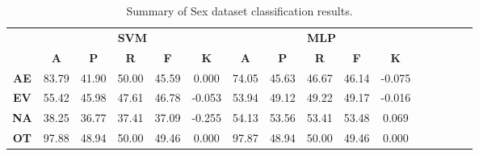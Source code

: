 \begin{landscape}
\begin{table}[htbp]
\footnotesize
\centering
\caption{Summary of Sex dataset classification results.}
\label{tab:base_female}
\begin{tabular}{|c|c|c|c|c|c|c|c|c|c|c|c|c|c|c|c|}
\hline
\multirow{2}{*}{}	& \multicolumn{5}{c|}{\textbf{SVM}}												& \multicolumn{5}{c|}{\textbf{MLP}}												\\ \cline{2-11} 
					& \textbf{A}	& \textbf{P}	& \textbf{R}	& \textbf{F}	& \textbf{K}	& \textbf{A}	& \textbf{P}	& \textbf{R}	& \textbf{F}	& \textbf{K}	\\ \hline
\textbf{AE}			& 83.79			& 41.90			& 50.00			& 45.59			& 0.000			& 74.05			& 45.63			& 46.67			& 46.14			& -0.075			\\ \hline
\textbf{EV}			& 55.42			& 45.98			& 47.61			& 46.78			& -0.053			& 53.94			& 49.12			& 49.22			& 49.17			& -0.016			\\ \hline
\textbf{NA}			& 38.25			& 36.77			& 37.41			& 37.09			& -0.255			& 54.13			& 53.56			& 53.41			& 53.48			& 0.069			\\ \hline
\textbf{OT}			& 97.88			& 48.94			& 50.00			& 49.46			& 0.000			& 97.87			& 48.94			& 50.00			& 49.46			& 0.000			\\ \hline
\end{tabular}
\end{table}
\end{landscape}